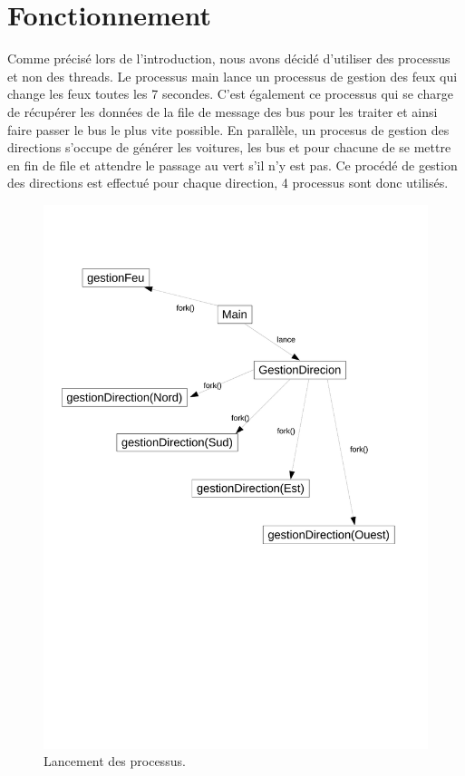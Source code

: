 \section{Fonctionnement}
Comme précisé lors de l'introduction, nous avons décidé d'utiliser des processus et non des threads. Le processus main lance un processus de gestion des feux qui change les feux toutes les 7 secondes. C'est également ce processus qui se charge de récupérer les données de la file de message des bus pour les traiter et ainsi faire passer le bus le plus vite possible. En parallèle, un procesus de gestion des directions s'occupe de générer les voitures, les bus et pour chacune de se mettre en fin de file et attendre le passage au vert s'il n'y est pas. Ce procédé de gestion des directions est effectué pour chaque direction, 4 processus sont donc utilisés.
\newpage
\begin{figure}[htb!]
\centering
\includegraphics[scale=0.5]{graphe3LO41.pdf}

\caption{Lancement des processus.}
\end{figure}
